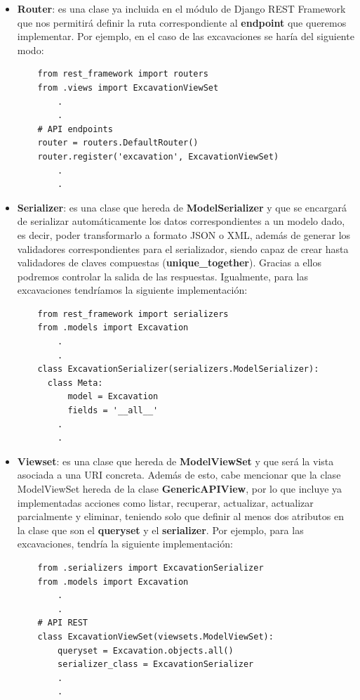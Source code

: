     \begin{itemize}
        \item \textbf{Router}: es una clase ya incluida en el módulo de Django REST
        Framework que nos permitirá definir la ruta correspondiente al \textbf{endpoint}
        que queremos implementar. Por ejemplo, en el caso de las excavaciones se haría del
        siguiente modo:
    \begin{verbatim}
    from rest_framework import routers
    from .views import ExcavationViewSet
        .
        .
    # API endpoints
    router = routers.DefaultRouter()
    router.register('excavation', ExcavationViewSet)
        .
        .
    \end{verbatim}

        \item \textbf{Serializer}: es una clase que hereda de \textbf{ModelSerializer}
        y que se encargará de serializar automáticamente los datos correspondientes a
        un modelo dado, es decir, poder transformarlo a formato JSON o XML, además
        de generar los validadores correspondientes para el serializador, siendo capaz
        de crear hasta validadores de claves compuestas (\textbf{unique\_together}).
        Gracias a ellos podremos controlar la salida de las respuestas. Igualmente, para
        las excavaciones tendríamos la siguiente implementación:
    \begin{verbatim}
    from rest_framework import serializers
    from .models import Excavation
        .
        .
    class ExcavationSerializer(serializers.ModelSerializer):
      class Meta:
          model = Excavation
          fields = '__all__'
        .
        .
    \end{verbatim}

        \item \textbf{Viewset}: es una clase que hereda de \textbf{ModelViewSet} y que
        será la vista asociada a una URI concreta. Además de esto, cabe mencionar que
        la clase ModelViewSet hereda de la clase \textbf{GenericAPIView}, por lo que
        incluye ya implementadas acciones como listar, recuperar, actualizar, actualizar
        parcialmente y eliminar, teniendo solo que definir al menos dos atributos en la
        clase que son el \textbf{queryset} y el \textbf{serializer}. Por ejemplo, para las
        excavaciones, tendría la siguiente implementación:
    \begin{verbatim}
    from .serializers import ExcavationSerializer
    from .models import Excavation
        .
        .
    # API REST
    class ExcavationViewSet(viewsets.ModelViewSet):
        queryset = Excavation.objects.all()
        serializer_class = ExcavationSerializer
        .
        .
    \end{verbatim}
        

\end{itemize}
